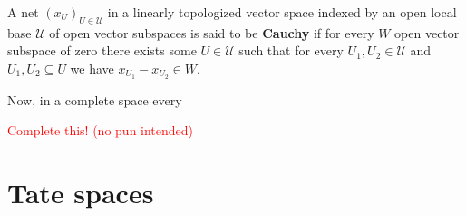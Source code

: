 \begin{definition}\label{def:cauchy-nets}
	A net $(x_{U})_{U \in \mathscr{U}}$ in a linearly topologized vector space indexed by an open local base $\mathscr{U}$ of open vector subspaces is said to be \textbf{Cauchy} if for every $W$ open vector subspace of zero there exists some $U \in \mathscr{U}$ such that for every $U_{1},U_{2} \in \mathscr{U}$ and $U_{1}, U_{2}\subseteq U$ we have $x_{U_{1}} - x_{U_{2}} \in W$. 
\end{definition}
Now, in a complete space every 
\begin{proposition}\label{prop:cauchy-iff-complete}
	
\end{proposition}
\textcolor{red}{Complete this! (no pun intended) }
\section{Tate spaces}
